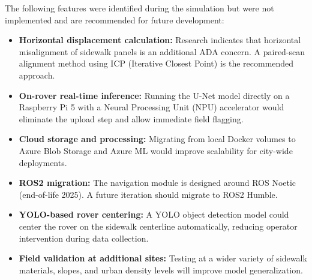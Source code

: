 \documentclass{article}
\begin{document}
The following features were identified during the simulation but were not implemented and are
recommended for future development:

\begin{itemize}
  \item \textbf{Horizontal displacement calculation:} Research indicates that horizontal
    misalignment of sidewalk panels is an additional ADA concern. A paired-scan alignment
    method using ICP (Iterative Closest Point) is the recommended approach.
  \item \textbf{On-rover real-time inference:} Running the U-Net model directly on a
    Raspberry Pi 5 with a Neural Processing Unit (NPU) accelerator would eliminate the
    upload step and allow immediate field flagging.
  \item \textbf{Cloud storage and processing:} Migrating from local Docker volumes to
    Azure Blob Storage and Azure ML would improve scalability for city-wide deployments.
  \item \textbf{ROS2 migration:} The navigation module is designed around ROS Noetic
    (end-of-life 2025). A future iteration should migrate to ROS2 Humble.
  \item \textbf{YOLO-based rover centering:} A YOLO object detection model could center
    the rover on the sidewalk centerline automatically, reducing operator intervention
    during data collection.
  \item \textbf{Field validation at additional sites:} Testing at a wider variety of
    sidewalk materials, slopes, and urban density levels will improve model generalization.
\end{itemize}
\end{document}
